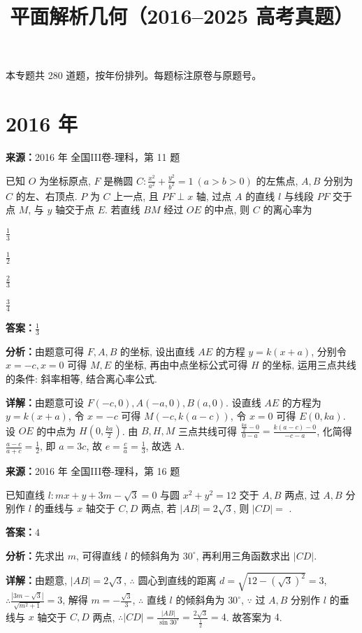 ﻿\title{平面解析几何（2016--2025 高考真题）}
\author{}
\date{}
\maketitle
\noindent 本专题共 280 道题，按年份排列。每题标注原卷与原题号。

\section*{2016 年}

\begin{question}[points=5]
\textbf{来源：}2016 年 全国III卷-理科，第 11 题\par
已知 $O$ 为坐标原点, $F$ 是椭圆 $C:\frac{x^2}{a^2}+\frac{y^2}{b^2}=1\ (a>b>0)$ 的左焦点, $A,B$ 分别为 $C$ 的左、右顶点. $P$ 为 $C$ 上一点, 且 $PF\perp x$ 轴, 过点 $A$ 的直线 $l$ 与线段 $PF$ 交于点 $M$, 与 $y$ 轴交于点 $E$. 若直线 $BM$ 经过 $OE$ 的中点, 则 $C$ 的离心率为
\begin{choices}
  \item $\frac{1}{3}$
  \item $\frac{1}{2}$
  \item $\frac{2}{3}$
  \item $\frac{3}{4}$
\end{choices}
\begin{solution}
\textbf{答案：}$\frac{1}{3}$

\textbf{分析：}由题意可得 $F,A,B$ 的坐标, 设出直线 $AE$ 的方程 $y=k(x+a)$, 分别令 $x=-c,x=0$ 可得 $M,E$ 的坐标, 再由中点坐标公式可得 $H$ 的坐标, 运用三点共线的条件: 斜率相等, 结合离心率公式.

\textbf{详解：}由题意可设 $F(-c,0),A(-a,0),B(a,0)$. 设直线 $AE$ 的方程为 $y=k(x+a)$, 令 $x=-c$ 可得 $M(-c,k(a-c))$, 令 $x=0$ 可得 $E(0,ka)$. 设 $OE$ 的中点为 $H(0,\frac{ka}{2})$. 由 $B,H,M$ 三点共线可得 $\frac{\frac{ka}{2}-0}{0-a}=\frac{k(a-c)-0}{-c-a}$, 化简得 $\frac{a-c}{a+c}=\frac{1}{2}$, 即 $a=3c$, 故 $e=\frac{c}{a}=\frac{1}{3}$, 故选 A.
\end{solution}
\end{question}

\begin{question}[points=5]
\textbf{来源：}2016 年 全国III卷-理科，第 16 题\par
已知直线 $l:mx+y+3m-\sqrt{3}=0$ 与圆 $x^2+y^2=12$ 交于 $A,B$ 两点, 过 $A,B$ 分别作 $l$ 的垂线与 $x$ 轴交于 $C,D$ 两点, 若 $|AB|=2\sqrt{3}$, 则 $|CD|=$ .
\fillin[{$4$}]
\begin{solution}
\textbf{答案：}$4$

\textbf{分析：}先求出 $m$, 可得直线 $l$ 的倾斜角为 $30^\circ$, 再利用三角函数求出 $|CD|$.

\textbf{详解：}由题意, $|AB|=2\sqrt{3}$, $\therefore$ 圆心到直线的距离 $d=\sqrt{12-(\sqrt{3})^2}=3$, $\therefore \frac{|3m-\sqrt{3}|}{\sqrt{m^2+1}}=3$, 解得 $m=-\frac{\sqrt{3}}{3}$, $\therefore$ 直线 $l$ 的倾斜角为 $30^\circ$, $\because$ 过 $A,B$ 分别作 $l$ 的垂线与 $x$ 轴交于 $C,D$ 两点, $\therefore |CD|=\frac{|AB|}{\sin30^\circ}=\frac{2\sqrt{3}}{\frac{1}{2}}=4$. 故答案为 $4$.
\end{solution}
\end{question}

